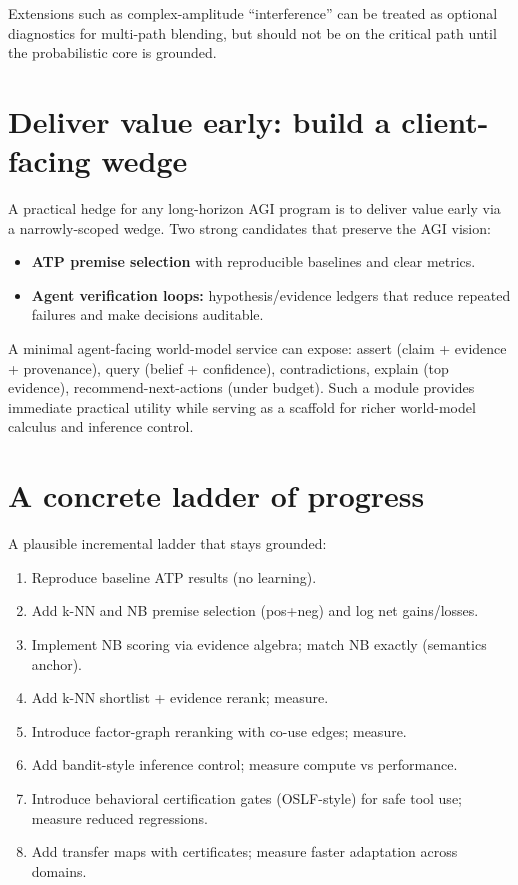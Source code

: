 \documentclass[11pt]{article}
\begin{document}
Extensions such as complex-amplitude ``interference'' can be treated as optional diagnostics for multi-path blending,
but should not be on the critical path until the probabilistic core is grounded.

\section{Deliver value early: build a client-facing wedge}

A practical hedge for any long-horizon AGI program is to deliver value early via a narrowly-scoped wedge.
Two strong candidates that preserve the AGI vision:
\begin{itemize}[leftmargin=2em]
\item \textbf{ATP premise selection} with reproducible baselines and clear metrics.
\item \textbf{Agent verification loops:} hypothesis/evidence ledgers that reduce repeated failures and make decisions auditable.
\end{itemize}

A minimal agent-facing world-model service can expose:
assert (claim + evidence + provenance), query (belief + confidence), contradictions, explain (top evidence), recommend-next-actions (under budget).
Such a module provides immediate practical utility while serving as a scaffold for richer world-model calculus and inference control.

\section{A concrete ladder of progress}

A plausible incremental ladder that stays grounded:

\begin{enumerate}[label=\textbf{R\arabic*.}, leftmargin=2em]
\item Reproduce baseline ATP results (no learning).
\item Add k-NN and NB premise selection (pos+neg) and log net gains/losses.
\item Implement NB scoring via evidence algebra; match NB exactly (semantics anchor).
\item Add k-NN shortlist + evidence rerank; measure.
\item Introduce factor-graph reranking with co-use edges; measure.
\item Add bandit-style inference control; measure compute vs performance.
\item Introduce behavioral certification gates (OSLF-style) for safe tool use; measure reduced regressions.
\item Add transfer maps with certificates; measure faster adaptation across domains.
\end{enumerate}
\end{document}
